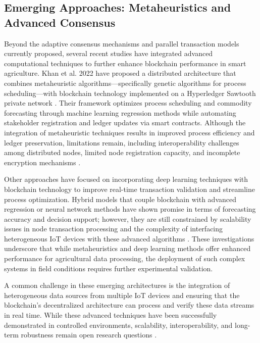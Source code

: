 \documentclass[12pt,onecolumn]{IEEEtran} %
\begin{document}
\subsection*{Emerging Approaches: Metaheuristics and Advanced Consensus}

Beyond the adaptive consensus mechanisms and parallel transaction models currently proposed, several recent studies have integrated advanced computational techniques to further enhance blockchain performance in smart agriculture. Khan et al. 2022 have proposed a distributed architecture that combines metaheuristic algorithms---specifically genetic algorithms for process scheduling---with blockchain technology implemented on a Hyperledger Sawtooth private network \cite{khan2022ablockchainand}. Their framework optimizes process scheduling and commodity forecasting through machine learning regression methods while automating stakeholder registration and ledger updates via smart contracts. Although the integration of metaheuristic techniques results in improved process efficiency and ledger preservation, limitations remain, including interoperability challenges among distributed nodes, limited node registration capacity, and incomplete encryption mechanisms \cite{khan2022ablockchainand}.

Other approaches have focused on incorporating deep learning techniques with blockchain technology to improve real-time transaction validation and streamline process optimization. Hybrid models that couple blockchain with advanced regression or neural network methods have shown promise in terms of forecasting accuracy and decision support; however, they are still constrained by scalability issues in node transaction processing and the complexity of interfacing heterogeneous IoT devices with these advanced algorithms \cite{khan2022ablockchainand, rana2020blockchainbasedtraceabilityand}. These investigations underscore that while metaheuristics and deep learning methods offer enhanced performance for agricultural data processing, the deployment of such complex systems in field conditions requires further experimental validation.

A common challenge in these emerging architectures is the integration of heterogeneous data sources from multiple IoT devices and ensuring that the blockchain's decentralized architecture can process and verify these data streams in real time. While these advanced techniques have been successfully demonstrated in controlled environments, scalability, interoperability, and long-term robustness remain open research questions \cite{khan2022ablockchainand}.
\end{document}
